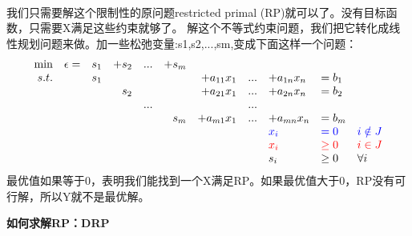 \documentclass[11pt]{article}
\begin{document}
\begin{CJK}{UTF8}{gbsn}
\begin{itemize}
\begin{small}
\[\begin{array}{rrrrrrrrrrrrl}
     \end{array} \nonumber
\]
\end{small}
\end{itemize}
我们只需要解这个限制性的原问题restricted primal (RP)就可以了。没有目标函数，只需要X满足这些约束就够了。
解这个不等式约束问题，我们把它转化成线性规划问题来做。加一些松弛变量:s1,s2,...,sm,变成下面这样一个问题：
\[
\begin{array}{rrrrrrrllllllllll}
 \min &\epsilon=&s_1    &+s_2   &...&+s_{m} &                   &    &                     &        & \\
 s.t.   &               &s_1    &           &   &            &+a_{11}x_1 &... &+a_{1n}x_{n} & =b_1 & \\
         &               &         &  s_2    &   &            &+a_{21}x_1 &... &+a_{2n}x_{n} & =b_2 & \\
         &               &         &           &...&            &                    &... &                     &          &\\
         &               &         &           &   & s_m    &+a_{m1}x_1 &... &+a_{mn}x_{n} & =b_m & \\
         &               &         &           &    &            &                         &   &\textcolor{blue}{x_i} & \textcolor{blue}{=  0}   &\textcolor{blue}{ i\notin J} \\
         &               &         &           &    &            &                         &    &\textcolor{red}{x_i}  &       \textcolor{red}{\geq  0}   & \textcolor{red}{i\in J} \\
         &               &         &           &     &            &                        &    &             s_i     & \geq 0 &  \forall i  \\
     \end{array} \nonumber
\]
最优值如果等于0，表明我们能找到一个X满足RP。如果最优值大于0，RP没有可行解，所以Y就不是最优解。


\textbf{如何求解RP：DRP}


\end{CJK}
\end{document}
